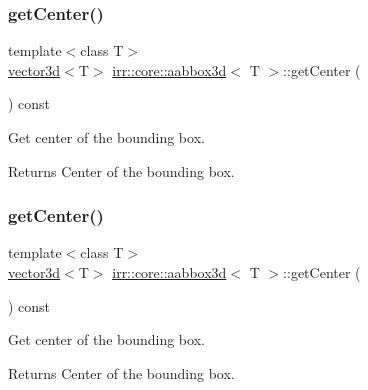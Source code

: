\subsubsection{\texorpdfstring{get\+Center()}{getCenter()}\hspace{0.1cm}{\footnotesize\ttfamily [1/2]}}
{\footnotesize\ttfamily template$<$class T$>$ \\
\hyperlink{classirr_1_1core_1_1vector3d}{vector3d}$<$T$>$ \hyperlink{classirr_1_1core_1_1aabbox3d}{irr\+::core\+::aabbox3d}$<$ T $>$\+::get\+Center (\begin{DoxyParamCaption}{ }\end{DoxyParamCaption}) const\hspace{0.3cm}{\ttfamily [inline]}}



Get center of the bounding box. 

\begin{DoxyReturn}{Returns}
Center of the bounding box. 
\end{DoxyReturn}
\mbox{\label{classirr_1_1core_1_1aabbox3d_ad2e956303fd85f900f93c067fd9c2647}} 
\subsubsection{\texorpdfstring{get\+Center()}{getCenter()}\hspace{0.1cm}{\footnotesize\ttfamily [2/2]}}
{\footnotesize\ttfamily template$<$class T$>$ \\
\hyperlink{classirr_1_1core_1_1vector3d}{vector3d}$<$T$>$ \hyperlink{classirr_1_1core_1_1aabbox3d}{irr\+::core\+::aabbox3d}$<$ T $>$\+::get\+Center (\begin{DoxyParamCaption}{ }\end{DoxyParamCaption}) const\hspace{0.3cm}{\ttfamily [inline]}}



Get center of the bounding box. 

\begin{DoxyReturn}{Returns}
Center of the bounding box. 
\end{DoxyReturn}
\mbox{\label{classirr_1_1core_1_1aabbox3d_acb31d9c6a79559c2636c1e32a3e2e459}} 
